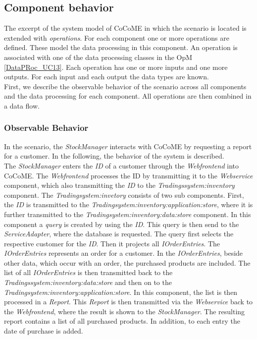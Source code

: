 \subsection{Component behavior}
The excerpt of the system model of CoCoME in which the scenario is located is extended with \textit{operations}. For each component one or more operations are defined. These model the data processing in this component. An operation is associated with one of the data processing classes in the OpM \autoref{DataPRoc_UC13}. Each operation has one or more inputs and one more outputs. For each input and each output the data types are known. \\
First, we describe the observable behavior of the scenario across all components and the data processing for each component. All operations are then combined in a data flow.
\subsubsection{Observable Behavior}
In the scenario, the \textit{StockManager} interacts with CoCoME by requesting a report for a customer. In the following, the behavior of the system  is described.\\
The \textit{StockManager} enters the \textit{ID} of a customer through the \textit{Webfrontend} into CoCoME. The \textit{Webfrontend} processes the ID by transmitting it to the \textit{Webservice} component, which also transmitting the \textit{ID} to the \textit{Tradingssystem:inventory} component. The \textit{Tradingsystem:invetory} consists of two sub components. First, the \textit{ID} is transmitted to the \textit{Tradingsystem:inventory:application:store}, where it is further transmitted to the \textit{Tradingsystem:inventory:data:store} component. In this component a \textit{query} is created by using the \textit{ID}. This query is then send to the \textit{ServiceAdapter}, where the database is requested. The query first selects the respective customer for the \textit{ID}. Then it projects all \textit{IOrderEntries}. The \textit{IOrderEntries} represents an order for a customer. In the \textit{IOrderEntries}, beside other data, which occur with an order, the purchased products are included. The list of all \textit{IOrderEntries} is then transmitted back to the \textit{Tradingssystem:inventory:data:store} and then on to the \textit{Tradingsystem:inventory:application:store}. In this component, the list is then processed in a \textit{Report}. This \textit{Report} is then transmitted via the \textit{Webservice} back to the \textit{Webfrontend}, where the result is shown to the \textit{StockManager}. The resulting report contains a list of all purchased products. In addition, to each entry the date of purchase is added.

